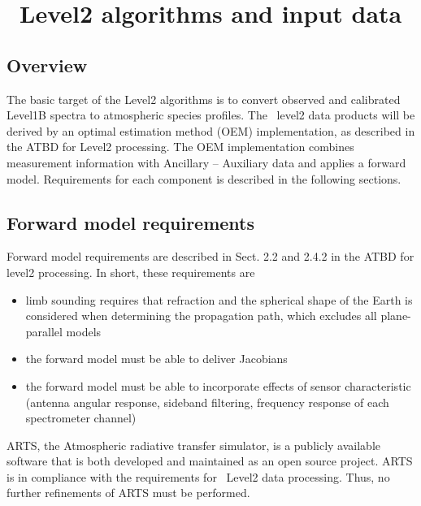 \chapter{\smr\ Level2 algorithms and input data}
\section{Overview}
The basic target of the Level2 algorithms is to
convert observed and calibrated Level1B spectra
to atmospheric species profiles.
The \smr\ level2 data products will be derived by an
optimal estimation method (OEM) implementation, as described
in the ATBD for Level2 processing. 
The OEM implementation combines measurement information with 
Ancillary -- Auxiliary data and applies a forward 
model. Requirements for each component is described in the
following sections.

\section{Forward model requirements}

Forward model requirements are described in Sect. 2.2
and 2.4.2 in the ATBD for level2 processing.
In short, these requirements are

\begin{itemize}


\item limb sounding requires that refraction and the spherical shape
of the Earth is considered when determining the propagation path,
which excludes all plane-parallel models 

\item the forward model must be able to deliver Jacobians

\item the forward model must be able to incorporate effects of
sensor characteristic (antenna angular response, sideband filtering,
frequency response of each spectrometer channel) 

\end{itemize}

ARTS, the Atmospheric radiative transfer simulator, 
is a publicly available software that is both developed and 
maintained as an open source project.
ARTS is in compliance with the requirements for \smr\ Level2
data processing. Thus, no further refinements of ARTS must be performed.


